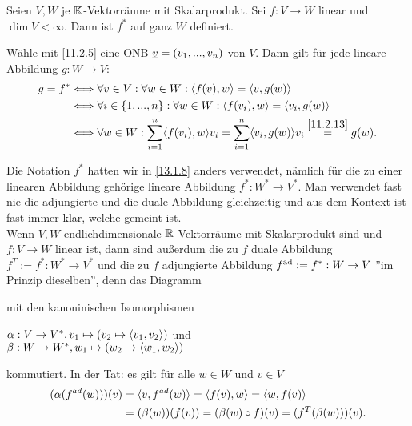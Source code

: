 \documentclass[../../main.tex]{subfiles}
\begin{document}
\begin{sat}\label{15.1.6}
Seien $V,W$ je $\mathbb K$-Vektorräume mit Skalarprodukt. Sei $f: V\to W$ linear und $\dim V<\infty$. Dann ist $f^*$ auf ganz $W$ definiert.
\end{sat}
\begin{cproof}
Wähle mit \ref{11.2.5} eine ONB ${\underline v}=(v_1,...,v_n)$ von $V$. Dann gilt für jede lineare Abbildung $g: W\to V$:
\begin{align*}
g=f^*&\Longleftrightarrow \forall v\in V: \forall w\in W: \langle f(v),w\rangle=\langle v,g(w)\rangle\\
&\Longleftrightarrow \forall i\in\{1,...,n\}: \forall w\in W: \langle f(v_i),w\rangle=\langle v_i, g(w)\rangle\\
&\Longleftrightarrow \forall w\in W: \sum_{i=1}^n \langle f(v_i),w\rangle v_i=\sum_{i=1}^n\langle v_i, g(w)\rangle v_i\stackrel{\ref{11.2.13}}{=}g(w).
\end{align*}
\end{cproof}
	
\begin{bem}\label{15.1.7}
Die Notation $f^*$ hatten wir in \ref{13.1.8} anders verwendet, nämlich für die zu einer linearen Abbildung gehörige lineare Abbildung $f^*: W^*\to V^*$. Man verwendet fast nie die adjungierte und die duale Abbildung gleichzeitig und aus dem Kontext ist fast immer klar, welche gemeint ist.\\
Wenn $V,W$ endlichdimensionale $\mathbb R$-Vektorräume mit Skalarprodukt sind und $f: V\to W$ linear ist, dann sind außerdum die zu $f$ duale Abbildung $f^T:=f^*: W^*\to V^*$ und die zu $f$ adjungierte Abbildung $f^{\operatorname{ad}}:=f^*: W\to V$ ''im Prinzip dieselben'', denn das Diagramm
\begin{center}
\end{center}
mit den kanoninischen Isomorphismen
\begin{center}
$\alpha: V\to V^*, v_1\mapsto(v_2\mapsto\langle v_1,v_2\rangle)$ und\\
$\beta: W\to W^*, w_1\mapsto(w_2\mapsto\langle w_1,w_2\rangle)$
\end{center}
kommutiert. In der Tat: es gilt für alle $w\in W$ und $v\in V$
\begin{align*}
(\alpha(f^{ad}(w)))(v)&=\langle v,f^{ad}(w)\rangle=\langle f(v),w\rangle=\langle w,f(v)\rangle\\
&=(\beta(w))(f(v))=(\beta(w)\circ f)(v)=(f^T(\beta(w)))(v).
\end{align*}
\end{bem}	
\end{document}
